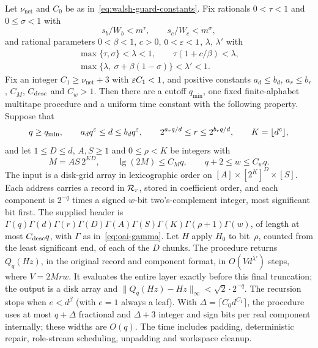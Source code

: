 \begin{proposition}\label{prop:prop14-param}
Let $\nu_{\mathrm{net}}$ and $C_0$ be as in~\eqref{eq:walsh-guard-constants}. Fix rationals $0<\tau<1$ and $0\le\sigma<1$ with
\[
  s_b/W_b<m^{\tau},\qquad s_c/W_c<m^{\sigma},
\]
and rational parameters $0<\beta<1$, $c>0$, $0<\varepsilon<1$, $\lambda$, $\lambda'$ with
\begin{align}
  \max\{\tau,\sigma\}<\lambda<1,\qquad \tau(1+c/\beta)<\lambda,\label{eq:walsh-layer-a}\\
  \max\{\lambda,\ \sigma+\beta(1-\sigma)\}<\lambda'<1.\label{eq:walsh-layer-b}
\end{align}
Fix an integer $C_1\ge\nu_{\mathrm{net}}+3$ with $\varepsilon C_1<1$, and positive constants $a_d\le b_d$, $a_r\le b_r$, $C_M$,
$C_{\rm desc}$ and $C_w>1$. Then there are a cutoff $q_{\min}$, one fixed finite-alphabet multitape procedure and a
uniform time constant with the following property. Suppose that
\begin{equation}\label{eq:walsh-layer-bands}
  q\ge q_{\min},\qquad a_dq^{\varepsilon}\le d\le b_dq^{\varepsilon},\qquad 2^{a_rq/d}\le r\le 2^{b_rq/d},\qquad K=\lfloor d^c\rfloor,
\end{equation}
and let $1\le D\le d$, $A,S\ge1$ and $0\le\rho<K$ be integers with
\[
  M=AS\,2^{KD},\qquad \lg(2M)\le C_Mq,\qquad q+2\le w\le C_wq.
\]
The input is a disk-grid array in lexicographic order on $[A]\times[2^K]^D\times[S]$. Each address carries a record in
$\mathcal{R}_r$, stored in coefficient order, and each component is $2^{-q}$ times a signed $w$-bit two's-complement integer,
most significant bit first. The supplied header is
$\Gamma(q)\Gamma(d)\Gamma(r)\Gamma(D)\Gamma(A)\Gamma(S)\Gamma(K)\Gamma(\rho+1)\Gamma(w)$, of length at most
$C_{\rm desc}q$, with $\Gamma$ as in~\eqref{eq:oai-gamma}. Let $H$ apply $H_0$ to bit~$\rho$, counted from the least
significant end, of each of the $D$ chunks. The procedure returns $Q_q(Hz)$, in the original record and component
format, in $O(Vd^{\lambda'})$ steps, where $V=2Mrw$. It evaluates the entire layer exactly before this final
truncation; the output is a disk array and $\|Q_q(Hz)-Hz\|_\infty<\sqrt2\cdot2^{-q}$. The recursion stops when
$e<d^\beta$ (with $e=1$ always a leaf). With $\Delta=\lceil C_0d^{C_1}\rceil$, the procedure uses at most $q+\Delta$
fractional and $\Delta+3$ integer and sign bits per real component internally; these widths are $O(q)$. The time
includes padding, deterministic repair, role-stream scheduling, unpadding and workspace cleanup.
\end{proposition}

